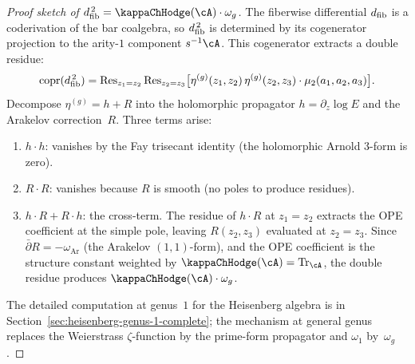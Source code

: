 \begin{proof}[Proof sketch of $\dfib^{\,2} = \kappaChHodge(\cA) \cdot \omega_g$]
The fiberwise differential $d_{\mathrm{fib}}$ is a coderivation of the bar coalgebra, so $d_{\mathrm{fib}}^{\,2}$ is determined by its cogenerator projection to the arity-$1$ component $s^{-1}\cA$. This cogenerator extracts a double residue:
\[
\mathrm{copr}(d_{\mathrm{fib}}^{\,2})
= \operatorname{Res}_{z_1 = z_2}\operatorname{Res}_{z_2 = z_3}
\bigl[\eta^{(g)}(z_1, z_2)\,\eta^{(g)}(z_2, z_3) \cdot \mu_2(a_1, a_2, a_3)\bigr].
\]
Decompose $\eta^{(g)} = h + R$ into the holomorphic propagator $h = \partial_z \log E$ and the Arakelov correction~$R$. Three terms arise:
\begin{enumerate}[label=\textup{(\alph*)}]
\item $h \cdot h$: vanishes by the Fay trisecant identity (the holomorphic Arnold $3$-form is zero).
\item $R \cdot R$: vanishes because $R$ is smooth (no poles to produce residues).
\item $h \cdot R + R \cdot h$: the cross-term. The residue of $h \cdot R$ at $z_1 = z_2$ extracts the OPE coefficient at the simple pole, leaving $R(z_2, z_3)$ evaluated at $z_2 = z_3$. Since $\bar\partial R = -\omega_{\mathrm{Ar}}$ (the Arakelov $(1,1)$-form), and the OPE coefficient is the structure constant weighted by $\kappaChHodge(\cA) = \mathrm{Tr}_\cA$, the double residue produces $\kappaChHodge(\cA) \cdot \omega_g$.
\end{enumerate}
The detailed computation at genus~$1$ for the Heisenberg algebra is in Section~\textup{\ref{sec:heisenberg-genus-1-complete}}; the mechanism at general genus replaces the Weierstrass $\zeta$-function by the prime-form propagator and $\omega_1$ by~$\omega_g$.
\end{proof}

